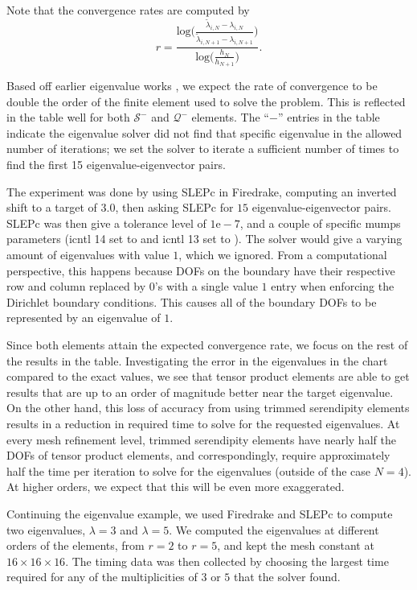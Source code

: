 \documentclass[format=acmsmall,screen,timestamp=false,a4paper]{acmart}
\begin{document}
Note that the convergence rates are computed by
\[r = \frac{\text{log}\bigg(\frac{\tilde{\lambda}_{i,N} - \lambda_{i,N}}{\tilde{\lambda}_{i,N+1} - \lambda_{i,N+1}} \bigg)}{\text{log}\bigg( \frac{h_N}{h_{N+1}} \bigg)}. \]

\noindent  Based off earlier eigenvalue works \cite{boffi2010finite}, we expect the rate of convergence to be double the order of the finite element used to solve the problem.  This is reflected in the table well for both $\mathcal{S}^-$ and $\mathcal{Q}^-$ elements.  The ``$-$'' entries in the table indicate the eigenvalue solver did not find that specific eigenvalue in the allowed number of iterations; we set the solver to iterate a sufficient number of times to find the first 15 eigenvalue-eigenvector pairs.

The experiment was done by using SLEPc in Firedrake, computing an inverted shift to a target of $3.0$, then asking SLEPc for $15$ eigenvalue-eigenvector pairs.  SLEPc was then give a tolerance level of $1\text{e}-7$, and a couple of specific mumps parameters ({\selectfont icntl 14} set to {} and {\selectfont icntl 13} set to {}). The solver would give a varying amount of eigenvalues with value $1$, which we ignored.  From a computational perspective, this happens because DOFs on the boundary have their respective row and column replaced by $0$'s with a single value $1$ entry when enforcing the Dirichlet boundary conditions.  This causes all of the boundary DOFs to be represented by an eigenvalue of $1$.

Since both elements attain the expected convergence rate, we focus on the rest of the results in the table.  Investigating the error in the eigenvalues in the chart compared to the exact values, we see that tensor product elements are able to get results that are up to an order of magnitude better near the target eigenvalue.  On the other hand, this loss of accuracy from using trimmed serendipity elements results in a reduction in required time to solve for the requested eigenvalues.  At every mesh refinement level, trimmed serendipity elements have nearly half the DOFs of tensor product elements, and correspondingly, require approximately half the time per iteration to solve for the eigenvalues (outside of the case $N=4$).  At higher orders, we expect that this will be even more exaggerated.  

Continuing the eigenvalue example, we used Firedrake and SLEPc to compute two eigenvalues, $\lambda = 3$ and $\lambda = 5$. We computed the eigenvalues at different orders of the elements, from $r=2$ to $r=5$, and kept the mesh constant at $16 \times 16 \times 16$.  The timing data was then collected by choosing the largest time required for any of the multiplicities of $3$ or $5$ that the solver found. 
\end{document}
